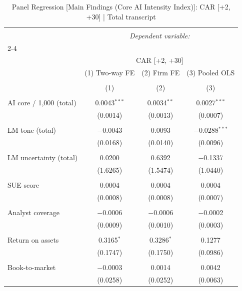 
\begin{table}[!htbp] \centering 
  \caption{Panel Regression [Main Findings (Core AI Intensity Index)]: CAR [+2, +30]  |  Total transcript} 
  \label{} 
\begin{tabular}{@{\extracolsep{5pt}}lccc} 
\\[-1.8ex]\hline 
\hline \\[-1.8ex] 
 & \multicolumn{3}{c}{\textit{Dependent variable:}} \\ 
\cline{2-4} 
\\[-1.8ex] & \multicolumn{3}{c}{CAR [+2, +30]} \\ 
 & (1) Two-way FE & (2) Firm FE & (3) Pooled OLS \\ 
\\[-1.8ex] & (1) & (2) & (3)\\ 
\hline \\[-1.8ex] 
 AI core / 1,000 (total) & 0.0043$^{***}$ & 0.0034$^{**}$ & 0.0027$^{***}$ \\ 
  & (0.0014) & (0.0013) & (0.0007) \\ 
  & & & \\ 
 LM tone (total) & $-$0.0043 & 0.0093 & $-$0.0288$^{***}$ \\ 
  & (0.0168) & (0.0140) & (0.0096) \\ 
  & & & \\ 
 LM uncertainty (total) & 0.0200 & 0.6392 & $-$0.1337 \\ 
  & (1.6265) & (1.5474) & (1.0440) \\ 
  & & & \\ 
 SUE score & 0.0004 & 0.0004 & 0.0004 \\ 
  & (0.0008) & (0.0008) & (0.0007) \\ 
  & & & \\ 
 Analyst coverage & $-$0.0006 & $-$0.0006 & $-$0.0002 \\ 
  & (0.0009) & (0.0010) & (0.0003) \\ 
  & & & \\ 
 Return on assets & 0.3165$^{*}$ & 0.3286$^{*}$ & 0.1277 \\ 
  & (0.1747) & (0.1750) & (0.0986) \\ 
  & & & \\ 
 Book-to-market & $-$0.0003 & 0.0014 & 0.0042 \\ 
  & (0.0258) & (0.0252) & (0.0063) \\ 

\end{tabular}
\end{table}
